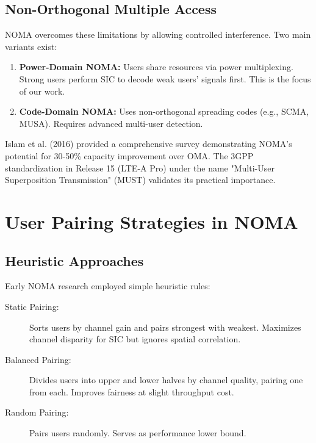 \subsection{Non-Orthogonal Multiple Access}

NOMA overcomes these limitations by allowing controlled interference. Two main variants exist:

\begin{enumerate}
    \item \textbf{Power-Domain NOMA:} Users share resources via power multiplexing. Strong users perform SIC to decode weak users' signals first. This is the focus of our work.
    
    \item \textbf{Code-Domain NOMA:} Uses non-orthogonal spreading codes (e.g., SCMA, MUSA). Requires advanced multi-user detection.
\end{enumerate}

Islam et al. (2016) \cite{islam2017power} provided a comprehensive survey demonstrating NOMA's potential for 30-50\% capacity improvement over OMA. The 3GPP standardization in Release 15 (LTE-A Pro) under the name "Multi-User Superposition Transmission" (MUST) validates its practical importance.

\section{User Pairing Strategies in NOMA}

\subsection{Heuristic Approaches}

Early NOMA research employed simple heuristic rules:

\begin{description}
    \item[Static Pairing:] Sorts users by channel gain and pairs strongest with weakest. Maximizes channel disparity for SIC but ignores spatial correlation.
    
    \item[Balanced Pairing:] Divides users into upper and lower halves by channel quality, pairing one from each. Improves fairness at slight throughput cost.
    
    \item[Random Pairing:] Pairs users randomly. Serves as performance lower bound.
\end{description}

